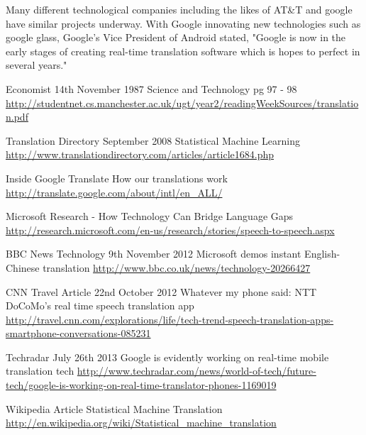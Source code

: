 \documentclass[12pt,a4paper]{article}
\begin{document}
Many different technological companies including the likes of AT\&T and google have similar projects underway.
With Google innovating new technologies such as google glass, Google's Vice President of Android stated, "Google is now in the early stages of creating real-time translation software which is hopes to perfect in several years."\cite{Techradar}


\newpage

\raggedright
\sloppy
\begin{thebibliography}{99}

Economist 14th November 1987
Science and Technology pg 97 - 98
\url{http://studentnet.cs.manchester.ac.uk/ugt/year2/readingWeekSources/translation.pdf}

Translation Directory September 2008 
Statistical Machine Learning
\url{http://www.translationdirectory.com/articles/article1684.php}

Inside Google Translate 
How our translations work
\url{http://translate.google.com/about/intl/en_ALL/}

Microsoft Research - How Technology Can Bridge Language Gaps
\url{http://research.microsoft.com/en-us/research/stories/speech-to-speech.aspx}

BBC News Technology 9th November 2012 
Microsoft demos instant English-Chinese translation
\url{http://www.bbc.co.uk/news/technology-20266427}

CNN Travel Article 22nd October 2012 
Whatever my phone said: NTT DoCoMo's real time speech translation app 
\url{http://travel.cnn.com/explorations/life/tech-trend-speech-translation-apps-smartphone-conversations-085231}

Techradar July 26th 2013
Google is evidently working on real-time mobile translation tech
\url{http://www.techradar.com/news/world-of-tech/future-tech/google-is-working-on-real-time-translator-phones-1169019}

Wikipedia Article
Statistical Machine Translation
\url{http://en.wikipedia.org/wiki/Statistical_machine_translation}
\end{thebibliography}
\end{document}
